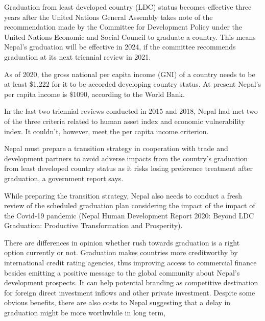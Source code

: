\documentclass[
  openany]{book}
\begin{document}
Graduation from least developed country (LDC) status becomes effective three years after the United Nations General Assembly takes note of the recommendation made by the Committee for Development Policy under the United Nations Economic and Social Council to graduate a country. This means Nepal's graduation will be effective in 2024, if the committee recommends graduation at its next triennial review in 2021.

As of 2020, the gross national per capita income (GNI) of a country needs to be at least \$1,222 for it to be accorded developing country status. At present Nepal's per capita income is \$1090, according to the World Bank.

In the last two triennial reviews conducted in 2015 and 2018, Nepal had met two of the three criteria related to human asset index and economic vulnerability index. It couldn't, however, meet the per capita income criterion.

Nepal must prepare a transition strategy in cooperation with trade and development partners to avoid adverse impacts from the country's graduation from least developed country status as it risks losing preference treatment after graduation, a government report says.

While preparing the transition strategy, Nepal also needs to conduct a fresh review of the scheduled graduation plan considering the impact of the impact of the Covid-19 pandemic (Nepal Human Development Report 2020: Beyond LDC Graduation: Productive Transformation and Prosperity).

There are differences in opinion whether rush towards graduation is a right option currently or not. Graduation makes countries more creditworthy by international credit rating agencies, thus improving access to commercial finance besides emitting a positive message to the global community about Nepal's development prospects. It can help potential branding as competitive destination for foreign direct investment inflows and other private investment. Despite some obvious benefits, there are also costs to Nepal suggesting that a delay in graduation might be more worthwhile in long term,
\end{document}
